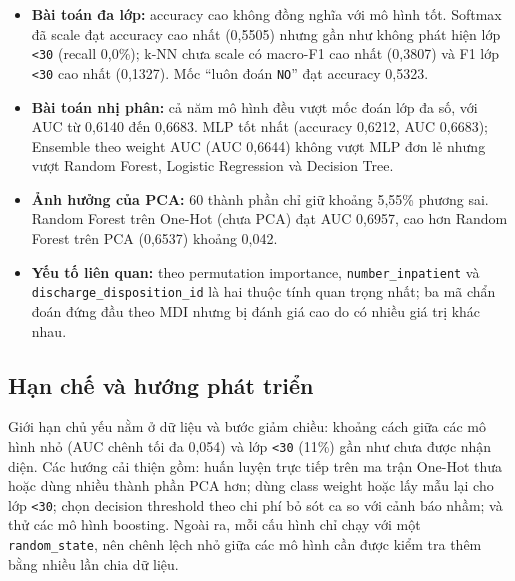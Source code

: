 \documentclass[a4paper]{report}
\begin{document}
\begin{itemize}
  \item \textbf{Bài toán đa lớp:} accuracy cao không đồng nghĩa với mô hình tốt. Softmax đã scale đạt accuracy cao nhất (0,5505) nhưng gần như không phát hiện lớp \texttt{<30} (recall 0,0\%); k-NN chưa scale có macro-F1 cao nhất (0,3807) và F1 lớp \texttt{<30} cao nhất (0,1327). Mốc ``luôn đoán \texttt{NO}'' đạt accuracy 0,5323.
  \item \textbf{Bài toán nhị phân:} cả năm mô hình đều vượt mốc đoán lớp đa số, với AUC từ 0,6140 đến 0,6683. MLP tốt nhất (accuracy 0,6212, AUC 0,6683); Ensemble theo weight AUC (AUC 0,6644) không vượt MLP đơn lẻ nhưng vượt Random Forest, Logistic Regression và Decision Tree.
  \item \textbf{Ảnh hưởng của PCA:} 60 thành phần chỉ giữ khoảng 5,55\% phương sai. Random Forest trên One-Hot (chưa PCA) đạt AUC 0,6957, cao hơn Random Forest trên PCA (0,6537) khoảng 0,042.
  \item \textbf{Yếu tố liên quan:} theo permutation importance, \texttt{number\_\allowbreak{}inpatient} và \texttt{discharge\_\allowbreak{}disposition\_\allowbreak{}id} là hai thuộc tính quan trọng nhất; ba mã chẩn đoán đứng đầu theo MDI nhưng bị đánh giá cao do có nhiều giá trị khác nhau.
\end{itemize}

\subsection{Hạn chế và hướng phát triển}

Giới hạn chủ yếu nằm ở dữ liệu và bước giảm chiều: khoảng cách giữa các mô hình nhỏ (AUC chênh tối đa 0,054) và lớp \texttt{<30} (11\%) gần như chưa được nhận diện. Các hướng cải thiện gồm: huấn luyện trực tiếp trên ma trận One-Hot thưa hoặc dùng nhiều thành phần PCA hơn; dùng class weight hoặc lấy mẫu lại cho lớp \texttt{<30}; chọn decision threshold theo chi phí bỏ sót ca so với cảnh báo nhầm; và thử các mô hình boosting. Ngoài ra, mỗi cấu hình chỉ chạy với một \texttt{random\_\allowbreak{}state}, nên chênh lệch nhỏ giữa các mô hình cần được kiểm tra thêm bằng nhiều lần chia dữ liệu.
\end{document}
